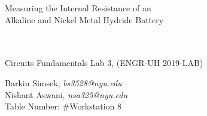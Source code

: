 \documentclass[journal]{IEEEtran}
\begin{document}
\begin{titlepage}
    {\centering
        \vspace*{20em}
        {
        \huge 
        \begin{spacing}{1.5}
            Measuring the Internal Resistance of an \\
            Alkaline and Nickel Metal Hydride Battery

            
            \\
            \\
            \bigskip
            \large
            Circuits Fundamentals Lab 3, (ENGR-UH 2019-LAB)
        \end{spacing}

        }
        
    }
    \vfill
    
    {
    \large
    
    \begin{spacing}{1.5}
    \noindent Barkin Simsek, {\it {bs3528@nyu.edu}} 
    \\
    Nishant Aswani, {\it {nsa325@nyu.edu}}
    \\
    Table Number: \#Workstation 8%
    \end{spacing}
    }


\end{titlepage}
\clearpage\mbox{}
\clearpage
{}
\setcounter{page}{1}




%
{}


\begin{abstract}
In this experiment, the internal resistance of two different kinds of batteries (Nickel metal-hydride and Alkaline) were calculated by connecting 3 different external loads (5 \ohm, 10 \ohm, 15 \ohm). The voltage drop across the resistors and the open circuit voltage of the battery were measured to calculate the internal resistance of the batteries. Finally, the collected data was fit into a curve and the power dissipated at the internal resistor and external load was compared.
\end{abstract}
\end{document}

